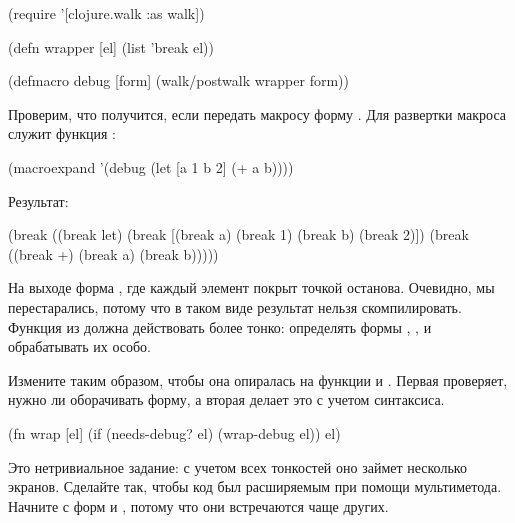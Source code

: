 
\begin{english}
  \begin{clojure}
(require
  '[clojure.walk :as walk])

(defn wrapper
  [el]
  (list 'break el))

(defmacro debug
  [form]
  (walk/postwalk wrapper form))
  \end{clojure}
\end{english}

Проверим, что получится, если передать макросу форму . Для развертки макроса служит функция :

\begin{english}
  \begin{clojure}
(macroexpand
 '(debug
   (let [a 1 b 2]
     (+ a b))))
  \end{clojure}
\end{english}

Результат:

\begin{english}
  \begin{clojure}
(break
 ((break let)
  (break [(break a) (break 1)
          (break b) (break 2)])
  (break ((break +) (break a) (break b)))))
  \end{clojure}
\end{english}

На выходе форма , где каждый элемент покрыт точкой останова. Очевидно, мы перестарались, потому что в таком виде результат нельзя скомпилировать. Функция  из  должна действовать более тонко: определять формы , ,  и обрабатывать их особо.

Измените  таким образом, чтобы она опиралась на функции  и . Первая проверяет, нужно ли оборачивать форму, а вторая делает это с учетом синтаксиса.

\begin{english}
  \begin{clojure}
(fn wrap [el]
  (if (needs-debug? el)
    (wrap-debug el))
  el)
  \end{clojure}
\end{english}

Это нетривиальное задание: с учетом всех тонкостей оно займет несколько экранов. Сделайте так, чтобы код был расширяемым при помощи мультиметода. Начните с форм  и , потому что они встречаются чаще других.

